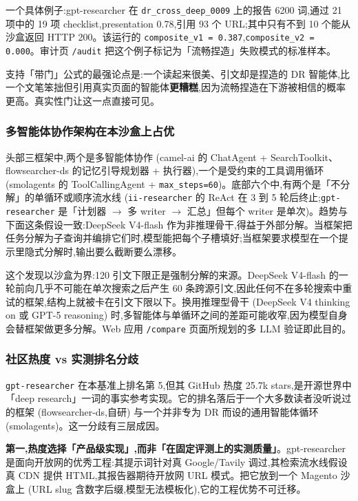 \documentclass[UTF8,a4paper,12pt,oneside]{ctexart}
\begin{document}
一个具体例子:gpt-researcher 在 \texttt{dr\_cross\_deep\_0009} 上的报告 6200 词,通过 21 项中的 19 项 checklist,presentation 0.78,引用 93 个 URL;其中只有不到 10 个能从沙盒返回 HTTP 200。该运行的 \texttt{composite\_v1 = 0.387},\texttt{composite\_v2 = 0.000}。审计页 \texttt{/audit} 把这个例子标记为「流畅捏造」失败模式的标准样本。

支持「带门」公式的最强论点是:一个读起来很美、引文却是捏造的 DR 智能体,比一个文笔笨拙但引用真实页面的智能体\textbf{更糟糕},因为流畅捏造在下游被相信的概率更高。真实性门让这一点直接可见。

\subsubsection{多智能体协作架构在本沙盒上占优}

头部三框架中,两个是多智能体协作 (camel-ai 的 ChatAgent + SearchToolkit、flowsearcher-ds 的记忆引导规划器 + 执行器),一个是受约束的工具调用循环 (smolagents 的 ToolCallingAgent + \texttt{max\_steps=60})。底部六个中,有两个是「不分解」的单循环或顺序流水线 (\texttt{ii-researcher} 的 ReAct 在 3 到 5 轮后终止;\texttt{gpt-researcher} 是「计划器 \(\to\) 多 writer \(\to\) 汇总」但每个 writer 是单次)。趋势与下面这条假设一致:DeepSeek V4-flash 作为非推理骨干,得益于外部分解。当框架把任务分解为子查询并编排它们时,模型能把每个子槽填好;当框架要求模型在一个提示里隐式分解时,输出要么截断要么漂移。

这个发现以沙盒为界:120 引文下限正是强制分解的来源。DeepSeek V4-flash 的一轮前向几乎不可能在单次搜索之后产生 60 条跨源引文,因此任何不在多轮搜索中重试的框架,结构上就被卡在引文下限以下。换用推理型骨干 (DeepSeek V4 thinking on 或 GPT-5 reasoning) 时,多智能体与单循环之间的差距可能收窄,因为模型自身会替框架做更多分解。Web 应用 \texttt{/compare} 页面所规划的多 LLM 验证即此目的。

\subsubsection{社区热度 vs 实测排名分歧}

\texttt{gpt-researcher} 在本基准上排名第 5,但其 GitHub 热度 25.7k stars,是开源世界中「deep research」一词的事实参考实现。它的排名落后于一个大多数读者没听说过的框架 (flowsearcher-ds,自研) 与一个并非专为 DR 而设的通用智能体循环 (smolagents)。这一分歧有三层成因。

\textbf{第一,热度选择「产品级实现」,而非「在固定评测上的实测质量」}。gpt-researcher 是面向开放网的优秀工程:其提示词针对真 Google/Tavily 调过,其检索流水线假设真 CDN 提供 HTML,其报告器期待开放网 URL 模式。把它放到一个 Magento 沙盒上 (URL slug 含数字后缀,模型无法模板化),它的工程优势不可迁移。
\end{document}
